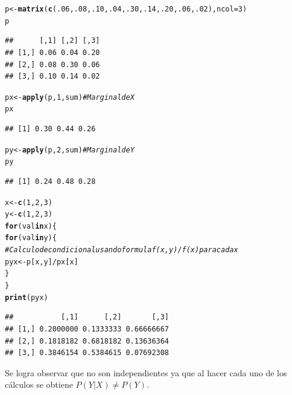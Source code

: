 \documentclass{article}\usepackage[]{graphicx}\usepackage[]{color}
\makeatletter
\newcommand{\hlnum}[1]{\textcolor[rgb]{0.686,0.059,0.569}{#1}}%
\newcommand{\hlcom}[1]{\textcolor[rgb]{0.678,0.584,0.686}{\textit{#1}}}%
\newcommand{\hlopt}[1]{\textcolor[rgb]{0,0,0}{#1}}%
\newcommand{\hlstd}[1]{\textcolor[rgb]{0.345,0.345,0.345}{#1}}%
\newcommand{\hlkwa}[1]{\textcolor[rgb]{0.161,0.373,0.58}{\textbf{#1}}}%
\newcommand{\hlkwb}[1]{\textcolor[rgb]{0.69,0.353,0.396}{#1}}%
\newcommand{\hlkwc}[1]{\textcolor[rgb]{0.333,0.667,0.333}{#1}}%
\newcommand{\hlkwd}[1]{\textcolor[rgb]{0.737,0.353,0.396}{\textbf{#1}}}%
\newenvironment{kframe}{%
 \def\at@end@of@kframe{}%
 \ifinner\ifhmode%
  \def\at@end@of@kframe{\end{minipage}}%
  \begin{minipage}{\columnwidth}%
 \fi\fi%
 \def\FrameCommand##1{\hskip\@totalleftmargin \hskip-\fboxsep
 \colorbox{shadecolor}{##1}\hskip-\fboxsep
     \hskip-\linewidth \hskip-\@totalleftmargin \hskip\columnwidth}%
 \MakeFramed {\advance\hsize-\width
   \@totalleftmargin\z@ \linewidth\hsize
   \@setminipage}}%
 {\par\unskip\endMakeFramed%
 \at@end@of@kframe}
\newenvironment{knitrout}{}{} %
\makeatother
\begin{document}
\begin{enumerate}[(a)]
\begin{knitrout}
\color{fgcolor}\begin{kframe}
\begin{alltt}
\hlstd{p} \hlkwb{<-} \hlkwd{matrix}\hlstd{(}\hlkwd{c}\hlstd{(}\hlnum{.06}\hlstd{,}\hlnum{.08}\hlstd{,}\hlnum{.10}\hlstd{,}\hlnum{.04}\hlstd{,}\hlnum{.30}\hlstd{,}\hlnum{.14}\hlstd{,}\hlnum{.20}\hlstd{,}\hlnum{.06}\hlstd{,}\hlnum{.02}\hlstd{),}\hlkwc{ncol}\hlstd{=}\hlnum{3}\hlstd{)}
\hlstd{p}
\end{alltt}
\begin{verbatim}
##      [,1] [,2] [,3]
## [1,] 0.06 0.04 0.20
## [2,] 0.08 0.30 0.06
## [3,] 0.10 0.14 0.02
\end{verbatim}
\begin{alltt}
\hlstd{px} \hlkwb{<-} \hlkwd{apply}\hlstd{(p,}\hlnum{1}\hlstd{,sum)} \hlcom{#Marginal de X}
\hlstd{px}
\end{alltt}
\begin{verbatim}
## [1] 0.30 0.44 0.26
\end{verbatim}
\begin{alltt}
\hlstd{py} \hlkwb{<-} \hlkwd{apply}\hlstd{(p,}\hlnum{2}\hlstd{,sum)} \hlcom{#Marginal de Y}
\hlstd{py}
\end{alltt}
\begin{verbatim}
## [1] 0.24 0.48 0.28
\end{verbatim}
\begin{alltt}
\hlstd{x} \hlkwb{<-} \hlkwd{c}\hlstd{(}\hlnum{1}\hlstd{,}\hlnum{2}\hlstd{,}\hlnum{3}\hlstd{)}
\hlstd{y} \hlkwb{<-} \hlkwd{c}\hlstd{(}\hlnum{1}\hlstd{,}\hlnum{2}\hlstd{,}\hlnum{3}\hlstd{)}
\hlkwa{for}\hlstd{(val} \hlkwa{in} \hlstd{x)\{}
    \hlkwa{for}\hlstd{(val} \hlkwa{in} \hlstd{y)\{}
    \hlcom{#Calculo de condicional usando formulaf(x,y)/f(x) para cada x}
    \hlstd{pyx}\hlkwb{<-} \hlstd{p[x,y]}\hlopt{/}\hlstd{px[x]}
    \hlstd{\}}
\hlstd{\}}
\hlkwd{print}\hlstd{(pyx)}
\end{alltt}
\begin{verbatim}
##           [,1]      [,2]       [,3]
## [1,] 0.2000000 0.1333333 0.66666667
## [2,] 0.1818182 0.6818182 0.13636364
## [3,] 0.3846154 0.5384615 0.07692308
\end{verbatim}
\end{kframe}
\end{knitrout}
Se logra observar que no son independientes ya que al hacer cada uno de los cálculos se obtiene $P(Y|X) \neq P(Y)$. 


\end{enumerate}
\end{document}
